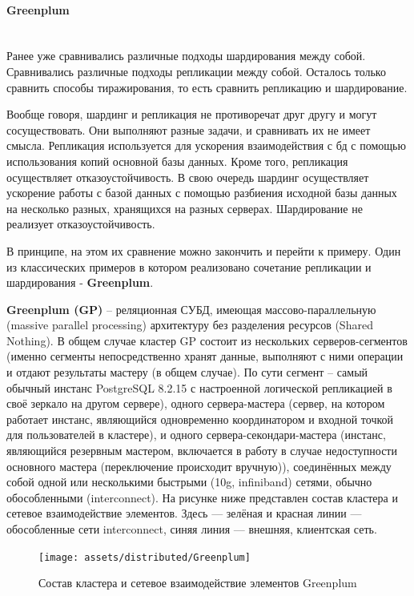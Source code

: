 \paragraph{Greenplum} ~\\
Ранее уже сравнивались различные подходы шардирования между собой. Сравнивались различные подходы репликации между
собой. Осталось только сравнить способы тиражирования, то есть сравнить репликацию и шардирование.

Вообще говоря, шардинг и репликация не противоречат друг другу и могут сосуществовать. Они выполняют разные задачи, и
сравнивать их не имеет смысла. Репликация используется для ускорения взаимодействия с бд с помощью использования копий
основной базы данных. Кроме того, репликация осуществляет отказоустойчивость. В свою очередь шардинг осуществляет
ускорение работы с базой данных с помощью разбиения исходной базы данных на несколько разных, хранящихся на разных
серверах.  Шардирование не реализует отказоустойчивость.

В принципе, на этом их сравнение можно закончить и перейти к примеру. Один из классических примеров в котором
реализовано сочетание репликации и шардирования - \textbf{Greenplum}.

\textbf{Greenplum (GP)} – реляционная СУБД, имеющая массово-параллельную (massive parallel processing) архитектуру без
разделения ресурсов (Shared Nothing). В общем случае кластер GP состоит из нескольких серверов-сегментов (именно
сегменты непосредственно хранят данные, выполняют с ними операции и отдают результаты мастеру (в общем случае). По сути
сегмент – самый обычный инстанс PostgreSQL 8.2.15 с настроенной логической репликацией в своё зеркало на другом
сервере), одного сервера-мастера (сервер, на котором работает инстанс, являющийся одновременно координатором и входной
точкой для пользователей в кластере), и одного сервера-секондари-мастера (инстанс, являющийся резервным мастером,
включается в работу в случае недоступности основного мастера (переключение происходит вручную)), соединённых между
собой одной или несколькими быстрыми (10g, infiniband) сетями, обычно обособленными (interconnect). На рисунке ниже
представлен состав кластера и сетевое взаимодействие элементов. Здесь — зелёная и красная линии — обособленные сети
interconnect, синяя линия — внешняя, клиентская сеть.

\begin{figure}[H]
    \centering
    \texttt{[image: assets/distributed/Greenplum]}
    \caption{Состав кластера и сетевое взаимодействие элементов Greenplum}
    \label{fig:Greenplum}
\end{figure}

